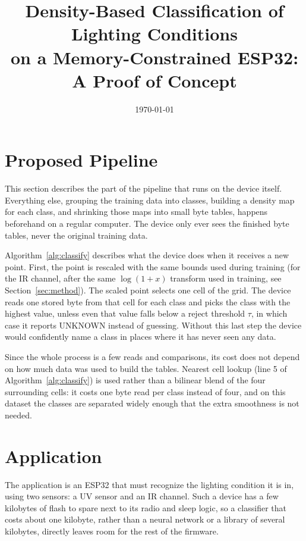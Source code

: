 \documentclass[conference]{IEEEtran}
\title{Density-Based Classification of Lighting Conditions\\ on a Memory-Constrained ESP32:\\ A Proof of Concept}
\author{
    \IEEEauthorblockN{Gianluca D'Altorio}
    \IEEEauthorblockA{Department of Computer Engineering Technology\\
    Vanier College}
}\date{\today}
\begin{document}
\maketitle

\section{Proposed Pipeline}
\label{sec:pipeline}
This section describes the part of the pipeline that runs on the device itself.  Everything else, grouping the training data into classes, building a density map for each class, and shrinking those maps into small byte tables, happens beforehand on a regular computer. The device only ever sees the finished byte tables, never the original training data.

Algorithm~\ref{alg:classify} describes what the device does when it receives a new point. First, the point is rescaled with the same bounds used during training (for the IR channel, after the same $\log(1+x)$ transform used in training, see Section~\ref{sec:method}). The scaled point selects one cell of the grid. The device reads one stored byte from that cell for each class and picks the class with the highest value, unless even that value falls below a reject threshold $\tau$, in which case it reports UNKNOWN instead of guessing. Without this last step the device would confidently name a class in places where it has never seen any data.

Since the whole process is a few reads and comparisons, its cost does not depend on how much data was used to build the tables. Nearest cell lookup (line 5 of Algorithm~\ref{alg:classify}) is used rather than a bilinear blend of the four surrounding cells: it costs one byte read per class instead of four, and on this dataset the classes are separated widely enough that the extra smoothness is not needed.



\section{Application}
\label{sec:application}
The application is an ESP32 that must recognize the lighting condition it is in, using two sensors: a UV sensor and an IR channel. Such a device has a few kilobytes of flash to spare next to its radio and sleep logic, so a classifier that costs about one kilobyte, rather than a neural network or a library of several kilobytes, directly leaves room for the rest of the firmware.
\end{document}
